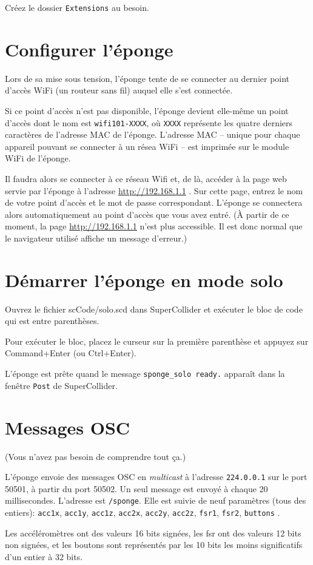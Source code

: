 \documentclass[11pt]{article}
\begin{document}
Créez le dossier \texttt{Extensions} au besoin.

\section{Configurer l'éponge}
\label{sec:orgb2519c4}
Lors de sa mise sous tension, l'éponge tente de se connecter au
dernier point d'accès WiFi (un routeur sans fil) auquel elle s'est
connectée.

Si ce point d'accès n'est pas disponible, l'éponge devient elle-même
un point d'accès dont le nom est \texttt{wifi101-XXXX}, où \texttt{XXXX}
représente les quatre derniers caractères de l'adresse MAC de
l'éponge.  L'adresse MAC -- unique pour chaque appareil pouvant se
connecter à un résea WiFi -- est imprimée sur le module WiFi de
l'éponge.

Il faudra alors se connecter à ce réseau Wifi et, de là, accéder à
la page web servie par l'éponge à l'adresse \url{http://192.168.1.1} .
Sur cette page, entrez le nom de votre point d'accès et le mot de
passe correspondant.  L'éponge se connectera alors automatiquement
au point d'accès que vous avez entré.  (À partir de ce moment, la
page \url{http://192.168.1.1} n'est plus accessible.  Il est donc normal
que le navigateur utilisé affiche un message d'erreur.)

\section{Démarrer l'éponge en mode solo}
\label{sec:org889919d}
Ouvrez le fichier scCode/solo.scd dans SuperCollider et exécuter le bloc de code
qui est entre parenthèses.

Pour exécuter le bloc, placez le curseur sur la première parenthèse
et appuyez sur Command+Enter (ou Ctrl+Enter).

L'éponge est prête quand le message \texttt{sponge\_solo ready.} apparaît dans la fenêtre
\texttt{Post} de SuperCollider.

\section{Messages OSC}
\label{sec:orgc949d6d}
(Vous n'avez pas besoin de comprendre tout ça.)

L'éponge envoie des messages OSC en \emph{multicast} à l'adresse
\texttt{224.0.0.1} sur le port 50501, à partir du port 50502.  Un seul
message est envoyé à chaque 20 millisecondes.  L'adresse est
\texttt{/sponge}.  Elle est suivie de neuf paramètres (tous des entiers):
\texttt{acc1x}, \texttt{acc1y}, \texttt{acc1z}, \texttt{acc2x}, \texttt{acc2y}, \texttt{acc2z}, \texttt{fsr1},
\texttt{fsr2}, \texttt{buttons} .

Les accéléromètres ont des valeurs 16 bits signées, les fsr ont des
valeurs 12 bits non signées, et les boutons sont représentés par les
10 bits les moins significatifs d'un entier à 32 bits.
\end{document}
